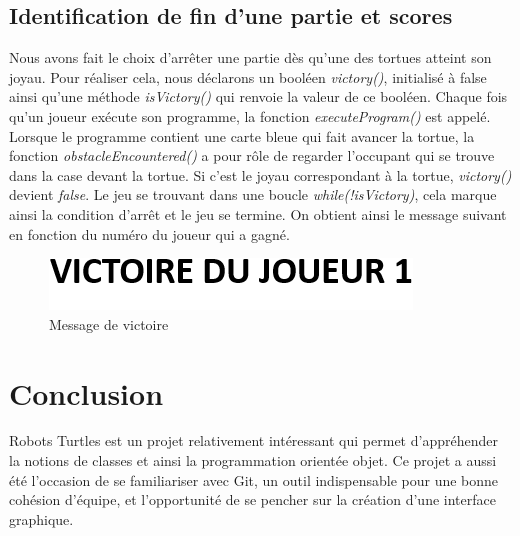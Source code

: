 \documentclass{article}
\begin{document}
	\subsection{Identification de fin d'une partie et scores}
\indent Nous avons fait le choix d'arrêter une partie dès qu'une des tortues atteint son joyau. Pour réaliser cela, nous déclarons un booléen \textit{victory()}, initialisé à false ainsi qu'une méthode \textit{isVictory()} qui renvoie la valeur de ce booléen. Chaque fois qu'un joueur exécute son programme, la fonction \textit{executeProgram()} est appelé. Lorsque le programme contient une carte bleue qui fait avancer la tortue, la fonction \textit{obstacleEncountered()} a pour rôle de regarder l'occupant qui se trouve dans la case devant la tortue. Si c'est le joyau correspondant à la tortue,  \textit{victory()} devient  \textit{false}. Le jeu se trouvant dans une boucle  \textit{while(!isVictory)}, cela marque ainsi la condition d'arrêt et le jeu se termine. On obtient ainsi le message suivant en fonction du numéro du joueur qui a gagné.
\vspace{8mm}
\par

\begin{figure}[h]
	\begin{center}
		\includegraphics[scale=0.6]{../img/victory1} 
	\end{center}
	\caption{Message de victoire}
\end{figure}  

\section{Conclusion}

Robots Turtles est un projet relativement intéressant qui permet d'appréhender la notions de classes et ainsi la programmation orientée objet. Ce projet a aussi été l'occasion de se familiariser avec Git, un outil indispensable pour une bonne cohésion d'équipe, et l'opportunité de se pencher sur la création d'une interface graphique.
\end{document}
